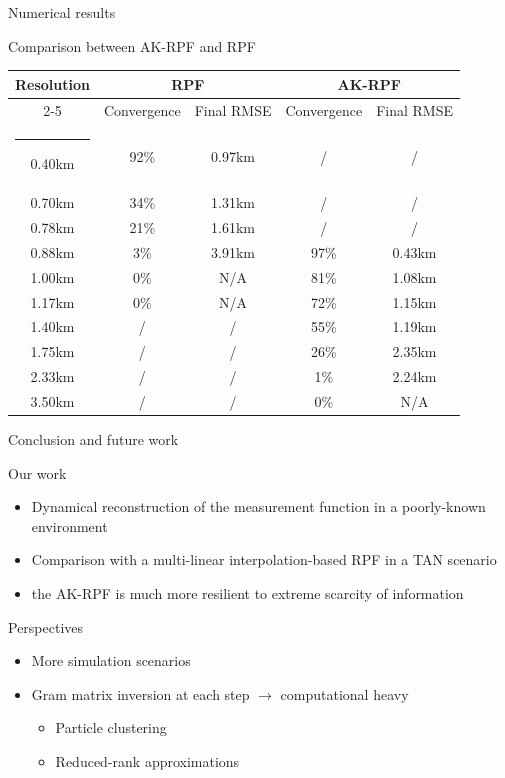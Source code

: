 \documentclass[9pt]{beamer}
\makeatletter
\def\hlinewd#1{
\noalign{\ifnum0=`}\fi\hrule \@height #1
\futurelet\reserved@a\@xhline}
\makeatother
\begin{document}
\begin{frame}{Numerical results}
\begin{block}{Comparison between AK-RPF and RPF}

\begin{center}
\renewcommand{\arraystretch}{1.1}
\begin{tabular}{|c|c|c|c|c|} \hline
\multirow{2}{*}{Resolution} & \multicolumn{2}{|c|}{RPF} & \multicolumn{2}{|c|}{AK-RPF} \\ \cline{2-5}
& Convergence & Final RMSE & Convergence & Final RMSE \\ \hlinewd{1.2pt}
0.40km & 92\% & 0.97km & / & / \\ \hline
0.70km & 34\% & 1.31km & / & / \\ \hline
0.78km & 21\% & 1.61km & / & / \\ \hline
0.88km & 3\% & 3.91km & 97\% & 0.43km \\ \hline
1.00km & 0\% & N/A & 81\% & 1.08km \\ \hline
1.17km & 0\% & N/A & 72\% & 1.15km \\ \hline
1.40km & / & / & 55\% & 1.19km \\ \hline
1.75km & / & / & 26\% & 2.35km \\ \hline
2.33km & / & / & 1\% & 2.24km \\ \hline
3.50km & / & / & 0\% & N/A \\ \hline
\end{tabular}
\end{center}

\end{block}
\end{frame}

\begin{frame}{Conclusion and future work}

\begin{block}{Our work}
\begin{itemize}
\item Dynamical reconstruction of the measurement function in a poorly-known environment
\item Comparison with a multi-linear interpolation-based RPF in a TAN scenario
\item[$\Rightarrow$] the AK-RPF is much more resilient to extreme scarcity of information
\end{itemize}
\end{block}

\begin{block}{Perspectives}
\begin{itemize}
\item More simulation scenarios
\item Gram matrix inversion at each step $\rightarrow$ computational heavy
\begin{itemize}
\item Particle clustering
\item Reduced-rank approximations
\end{itemize}
\end{itemize}
\end{block}

\end{frame}
\end{document}
